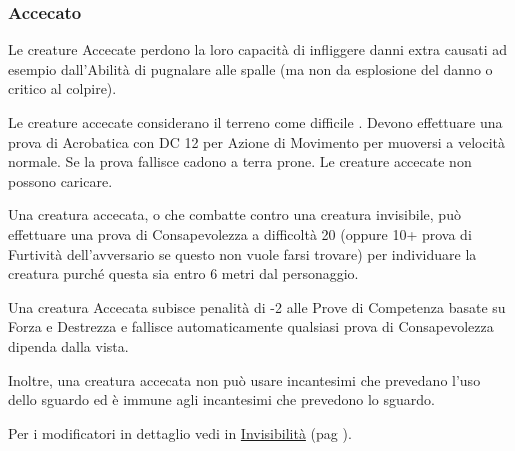 \begin{multicols}{2}
\subsubsection{Accecato}

\label{accecato}

Le creature Accecate perdono la loro capacità di infliggere danni extra causati ad esempio dall'Abilità di pugnalare alle spalle (ma non da esplosione del danno o critico al colpire).

Le creature accecate considerano il terreno come difficile . Devono effettuare una prova di Acrobatica con DC 12 per Azione di Movimento per muoversi a velocità normale. Se la prova fallisce cadono a terra prone. Le creature accecate non possono caricare.

Una creatura accecata, o che combatte contro una creatura invisibile, può effettuare una prova di Consapevolezza a difficoltà 20 (oppure 10+ prova di Furtività dell'avversario se questo non vuole farsi trovare) per individuare la creatura purché questa sia entro 6 metri dal personaggio.

Una creatura Accecata subisce penalità di -2 alle Prove di Competenza basate su Forza e Destrezza e fallisce automaticamente qualsiasi prova di Consapevolezza dipenda dalla vista.

Inoltre, una creatura accecata non può usare incantesimi che prevedano l'uso dello sguardo ed è immune agli incantesimi che prevedono lo sguardo.

Per i modificatori in dettaglio vedi in \hyperlink{invisibilita}{Invisibilità} (pag \pageref{invisibilita}).


\end{multicols}
